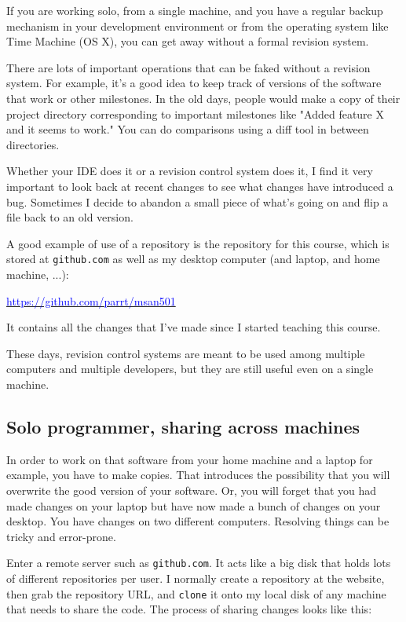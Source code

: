 \documentclass[titlepage]{tufte-book}
\begin{document}
If you are working solo, from a single machine, and you have a regular backup mechanism in your development environment or from the operating system like Time Machine (OS X), you can get away without a formal revision system.

There are lots of important operations that can be faked without a revision system.  For example, it's a good idea to keep track of versions of the software that work or other milestones. In the old days, people would make a copy of their project directory corresponding to important milestones like "Added feature X and it seems to work." You can do comparisons using a diff tool in between directories.

Whether your IDE does it or a revision control system does it, I find it very important to look back at recent changes to see what changes have introduced a bug.  Sometimes I decide to abandon a small piece of what's going on and flip a file back to an old version.

A good example of use of a repository is the repository for this course, which is stored at {\tt github.com} as well as my desktop computer (and laptop, and home machine, ...):

\href{https://github.com/parrt/msan501}{\textcolor{blue}{https://github.com/parrt/msan501}}

\noindent It contains all the changes that I've made since I started teaching this course.

These days, revision control systems are meant to be used among multiple computers and multiple developers, but they are still useful even on a single machine.

\subsection{Solo programmer, sharing across machines}

In order to work on that software from your home machine and a laptop for example, you have to make copies. That introduces the possibility that you will overwrite the good version of your software. Or, you will forget that you had made changes on your laptop but have now made a bunch of changes on your desktop.  You have changes on two different computers. Resolving things can be tricky and error-prone.

Enter a remote server such as {\tt github.com}. It acts like a big disk that holds lots of different repositories per user. I normally create a repository at the website, then grab the repository URL, and {\tt clone} it onto my local disk of any machine that needs to share the code. The process of sharing changes looks like this:
\end{document}
